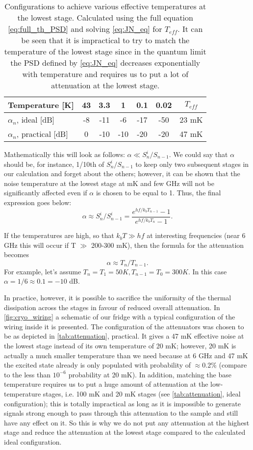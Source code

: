 \begin{table}
\centering
\begin{tabular}{l|c|c|c|c|c|c}
\hline
Temperature [K] & 43 & 3.3 & 1 &0.1 & 0.02 & $T_{eff}$ \\
\hline
$\alpha_n$,  ideal [dB] & -8 & -11 & -6 & -17 & -50 &23 mK \\
$\alpha_n$, practical [dB] & 0 & -10 & -10 & -20 & -20 & 47 mK\\
\hline
\end{tabular}

\caption{Configurations to achieve various effective temperatures at the lowest stage. Calculated using the full equation \eqref{eq:full_th_PSD} and solving \eqref{eq:JN_eq} for $T_{eff}$. It can be seen that it is impractical to try to match the temperature of the lowest stage since in the quantum limit the PSD defined by \eqref{eq:JN_eq} decreases exponentially with temperature and requires us to put a lot of attenuation at the lowest stage.}
\label{tab:attenuation}
\end{table}

Mathematically this will look as follows: $\alpha \ll {S^i_n}/{S_{n-1}}$. We could say that $\alpha$ should be, for instance, 1/10th of ${S^i_n}/{S_{n-1}}$ to keep only two subsequent stages in our calculation and forget about the others; however, it can be shown that the noise temperature at the lowest stage at mK and few GHz will not be significantly affected even if $\alpha$ is chosen to be equal to 1. Thus, the final expression goes below:
\[
 \alpha \approx  {S^i_n}/{S^i_{n-1}} =  \frac{e^{hf/k_b T_{n-1}} -1}{e^{hf/k_b T_n}-1}.
\]

If the temperatures are high, so that $k_b T \gg hf$ at interesting frequencies (near 6 GHz this will occur if T $\gg$ 200-300 mK), then the formula for the attenuation becomes
$$
\alpha \approx T_n/T_{n-1}.
$$
For example, let's assume $T_n = T_1 = 50K, T_{n-1} = T_0 = 300K$. In this case $\alpha = 1/6 \approx 0.1 = -10$ dB. 

In practice, however, it is possible to sacrifice the uniformity of the thermal dissipation across the stages in favour of reduced overall attenuation. In \autoref{fig:cryo_wiring} a schematic of our fridge with a typical configuration of the wiring inside it is presented. The configuration of the attenuators was chosen to be as depicted in \autoref{tab:attenuation}, practical. It gives a 47 mK effective noise at the lowest stage instead of its own temperature of 20 mK; however, 20 mK is actually a much smaller temperature than we need because at 6 GHz and 47 mK the excited state already is only populated with probability of $\approx$0.2\% (compare to the less than $10^{-6}$ probability at 20 mK). In addition, matching the base temperature requires us to put a huge amount of attenuation at the low-temperature stages, i.e. 100 mK and 20 mK stages (see \autoref{tab:attenuation}, ideal configuration); this is totally impractical as long as it is impossible to generate signals strong enough to pass through this attenuation to the sample and still have any effect on it. So this is why we do not put any attenuation at the highest stage and reduce the attenuation at the lowest stage compared to the calculated ideal configuration.


